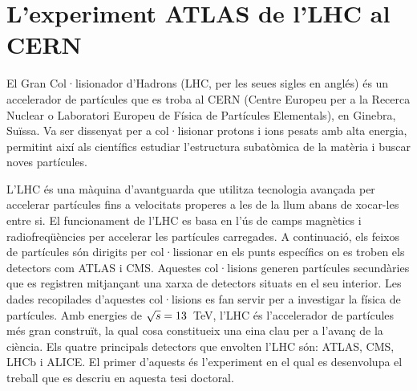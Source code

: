 \FloatBarrier
\section{L'experiment ATLAS de l'LHC al CERN}
\label{chap:resumen_val:Exp}
El Gran Col·lisionador d'Hadrons (LHC, per les seues sigles en anglés) és un accelerador de partícules que es troba 
al CERN (Centre Europeu per a la Recerca Nuclear o Laboratori Europeu de Física de Partícules Elementals), en 
Ginebra, Suïssa. Va ser dissenyat per a col·lisionar protons i ions pesats amb alta energia, permitint així als científics 
estudiar l'estructura subatòmica de la matèria i buscar noves partícules.

L'LHC és una màquina d'avantguarda que utilitza tecnologia avançada per accelerar partícules fins a velocitats 
properes a les de la llum abans de xocar-les entre si. El funcionament 
de l'LHC es basa en l'ús de camps magnètics i radiofreqüències per accelerar les partícules carregades.
A continuació, els feixos de partícules són dirigits per col·lissionar en els punts específics on es troben els detectors 
com ATLAS i CMS.
Aquestes col·lisions generen partícules secundàries que es 
registren mitjançant una xarxa de detectors situats en el seu interior. Les dades recopilades d'aquestes col·lisions 
es fan servir per a investigar la física de partícules. Amb energies de $\sqrt{s} = 13$~TeV, l'LHC és l'accelerador de 
partícules més gran construït, la qual cosa constitueix una eina clau per a l'avanç de la ciència. 
Els quatre principals detectors que envolten l'LHC són: ATLAS, CMS, LHCb i ALICE. 
El primer d'aquests és l'experiment en el qual es desenvolupa el treball que es descriu 
en aquesta tesi doctoral. 





